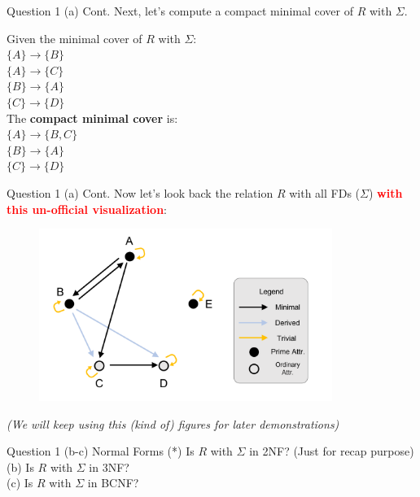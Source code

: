 \begin{frame}[fragile]{Question 1 (a) Cont.}
	Next, let's compute a compact minimal cover of $R$ with $\Sigma$.\vspace{10pt}
	
	Given the minimal cover of $R$ with $\Sigma$:\\\vspace{3pt}
	$\{A\} \rightarrow \{B\}$\\	
	$\{A\} \rightarrow \{C\}$\\	
	$\{B\} \rightarrow \{A\}$\\
	$\{C\} \rightarrow \{D\}$\\\vspace{5pt}
	The \textbf{compact minimal cover} is:\\\vspace{3pt}
	$\{A\} \rightarrow \{B, C\}$\\	
	$\{B\} \rightarrow \{A\}$\\	
	$\{C\} \rightarrow \{D\}$
\end{frame}

\begin{frame}[fragile]{Question 1 (a) Cont.}
Now let's look back the relation $R$ with all FDs ($\Sigma$) \textcolor{red}{\textbf{with this un-official visualization}}:\\\vspace{5pt}
\begin{figure}
	\includegraphics[width=0.85\textwidth, trim=0 0 0 0, clip]{t5/images/end_q1.png}
\end{figure}

\textit{(We will keep using this (kind of) figures for later demonstrations)}
\end{frame}

\begin{frame}[fragile]{Question 1 (b-c) Normal Forms}
(*) Is $R$ with $\Sigma$ in 2NF? (Just for recap purpose)\\\vspace{10pt}
(b) Is $R$ with $\Sigma$ in 3NF?\\\vspace{10pt}
(c) Is $R$ with $\Sigma$ in BCNF?\\\vspace{10pt}
\end{frame}

